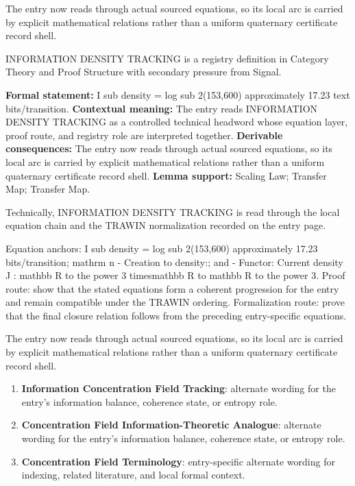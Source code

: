 The entry now reads through actual sourced equations, so its local arc is carried by explicit mathematical relations rather than a uniform quaternary certificate record shell.
\clearpage


\begingroup\small
{}
INFORMATION DENSITY TRACKING is a registry definition in Category Theory and Proof Structure with secondary pressure from Signal.

\begingroup\footnotesize\setlength{\emergencystretch}{3em}\sloppy
\textbf{Formal statement:} I sub density = log sub 2(153,600) approximately 17.23 text bits/transition. \textbf{Contextual meaning:} The entry reads INFORMATION DENSITY TRACKING as a controlled technical headword whose equation layer, proof route, and registry role are interpreted together. \textbf{Derivable consequences:} The entry now reads through actual sourced equations, so its local arc is carried by explicit mathematical relations rather than a uniform quaternary certificate record shell. \textbf{Lemma support:} Scaling Law; Transfer Map; Transfer Map.\par
\endgroup

Technically, INFORMATION DENSITY TRACKING is read through the local equation chain and the TRAWIN normalization recorded on the entry page.

Equation anchors: I sub density = log sub 2(153,600) approximately 17.23 bits/transition; mathrm n - Creation to density:; and - Functor: Current density J : mathbb R to the power 3 timesmathbb R to mathbb R to the power 3. Proof route: show that the stated equations form a coherent progression for the entry and remain compatible under the TRAWIN ordering. Formalization route: prove that the final closure relation follows from the preceding entry-specific equations.

The entry now reads through actual sourced equations, so its local arc is carried by explicit mathematical relations rather than a uniform quaternary certificate record shell.
\endgroup

\begin{enumerate}[leftmargin=1.6em,itemsep=6pt,topsep=4pt]
\item \textbf{Information Concentration Field Tracking}: alternate wording for the entry's information balance, coherence state, or entropy role.
\item \textbf{Concentration Field Information-Theoretic Analogue}: alternate wording for the entry's information balance, coherence state, or entropy role.
\item \textbf{Concentration Field Terminology}: entry-specific alternate wording for indexing, related literature, and local formal context.
\end{enumerate}

